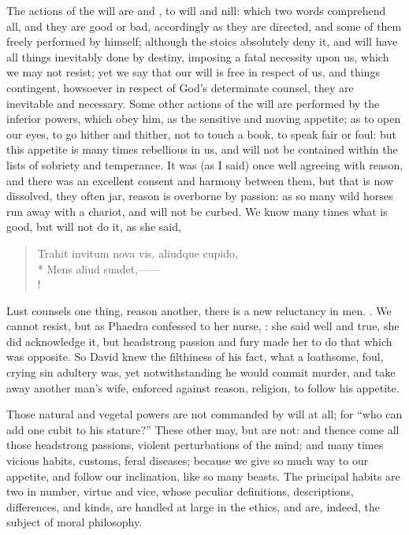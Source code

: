 The actions of the will are  and , to will and nill: which
two words comprehend all, and they are good or bad, accordingly as they are
directed, and some of them freely performed by himself; although the stoics
absolutely deny it, and will have all things inevitably done by destiny,
imposing a fatal necessity upon us, which we may not resist; yet we say that
our will is free in respect of us, and things contingent, howsoever in respect
of God's determinate counsel, they are inevitable and necessary. Some other
actions of the will are performed by the inferior powers, which obey him, as
the sensitive and moving appetite; as to open our eyes, to go hither and
thither, not to touch a book, to speak fair or foul: but this appetite is many
times rebellious in us, and will not be contained within the lists of sobriety
and temperance. It was (as I said) once well agreeing with reason, and there
was an excellent consent and harmony between them, but that is now dissolved,
they often jar, reason is overborne by passion:  as so many wild horses run away with a chariot, and will
not be curbed. We know many times what is good, but will not do it, as she
said,

\begin{latin}
\begin{verse}
Trahit invitum nova vis, aliudque cupido,\\*
Mens aliud suadet,------\\!
\end{verse}
\end{latin}

Lust counsels one thing, reason another, there is a new reluctancy in men.
. We
cannot resist, but as Phaedra confessed to her nurse,
: she said well and true, she did acknowledge it, but headstrong passion
and fury made her to do that which was opposite. So David knew the filthiness
of his fact, what a loathsome, foul, crying sin adultery was, yet
notwithstanding he would commit murder, and take away another man's wife,
enforced against reason, religion, to follow his appetite.

Those natural and vegetal powers are not commanded by will at all; for \enquote{who can
add one cubit to his stature?} These other may, but are not: and thence come
all those headstrong passions, violent perturbations of the mind; and many
times vicious habits, customs, feral diseases; because we give so much way to
our appetite, and follow our inclination, like so many beasts. The principal
habits are two in number, virtue and vice, whose peculiar definitions,
descriptions, differences, and kinds, are handled at large in the ethics, and
are, indeed, the subject of moral philosophy.

